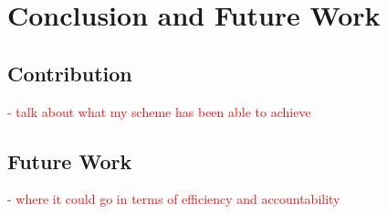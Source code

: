 \chapter{Conclusion and Future Work}
\label{chap:conclusions}

\section{Contribution}

\textcolor{red}{- talk about what my scheme has been able to achieve}

\section{Future Work}

\textcolor{red}{- where it could go in terms of efficiency and accountability}
